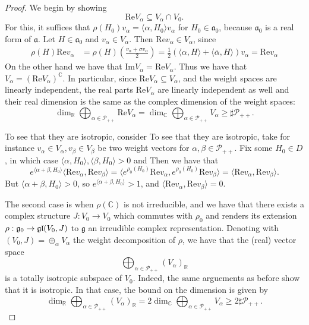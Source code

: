 \documentclass{report}
\begin{document}
\begin{itemize}
\begin{proof}
        We begin by showing
        \[
        \mathrm{Re}V_\alpha \subseteq V_\alpha \cap V_0.
        \]
        For this, it suffices that $\rho(H_0) v_\alpha = \langle \alpha, H_0 \rangle v_\alpha$ for $H_0 \in \mathfrak a_0$, because $\mathfrak a_0$ is a real form of $\mathfrak a$.
        Let $H \in \mathfrak a_0$ and $ v_\alpha \in V_\alpha$.
        Then $\mathrm{Re}v_\alpha \in V_\alpha$, since
        \begin{align*}
            \rho(H) \mathrm{Re}v_\alpha &= \rho(H)\left(\frac{v_\alpha + \sigma v_\alpha}{2}\right) = \frac{1}{2}\left(\langle \alpha, H \rangle + \langle \overline \alpha, H \rangle \right)v_\alpha = \mathrm{Re}v_\alpha
        \end{align*}
        On the other hand we have that $\mathrm{Im}V_\alpha = \mathrm{Re}V_\alpha$.
        Thus we have that $V_\alpha = \left(\mathrm{Re}V_\alpha\right)^\mathbb C$.
        In particular, since $\mathrm{Re}V_\alpha \subseteq V_\alpha$, and the weight spaces are linearly independent, the real parts $\mathrm{Re}V_\alpha$ are linearly independent as well and their real dimension is the same as the complex dimension of the weight spaces:
        \[
        \dim_\mathbb R \bigoplus_{\alpha \in \mathcal P_{++}} \mathrm{Re}V_\alpha = \dim_\mathbb C \bigoplus_{\alpha \in \mathcal P_{++}} V_\alpha \geq \sharp \mathcal P_{++}.
        \]

        To see that they are isotropic, consider 
        To see that they are isotropic, take for instance $v_\alpha \in V_\alpha, v_\beta \in V_\beta$ be two weight vectors for $\alpha, \beta \in \mathcal P_{++}$.
        Fix some $H_0 \in D$, in which case $\langle \alpha, H_0 \rangle, \langle \beta, H_0 \rangle > 0$ and 
        Then we have that 
        \[
        e^{\langle \alpha + \beta, H_0 \rangle} \langle \mathrm{Re}v_\alpha, \mathrm{Re}v_\beta \rangle = \langle e^{\rho_0(H_0)} \mathrm{Re}v_\alpha, e^{\rho_0(H_0)} \mathrm{Re}v_\beta \rangle = \langle \mathrm{Re}v_\alpha, \mathrm{Re}v_\beta \rangle.
        \]
        But $\langle \alpha + \beta, H_0 \rangle > 0$, so $e^{\langle \alpha + \beta, H_0 \rangle} > 1$, and $\langle \mathrm{Re}v_\alpha, \mathrm{Re}v_\beta \rangle = 0$.

        The second case is when $\rho(\mathbb C)$ is not irreducible, and we have that there exists a complex structure $J: V_0 \to V_0$ which commutes with $\rho_0$ and renders its extension $\rho: \mathfrak g_0 \to \operatorname{{\mathfrak{gl}}}(V_0, J)$ to $\mathfrak g$ an irreudible complex representation.
        Denoting with $(V_0, J) = \oplus_\alpha V_\alpha$ the weight decomposition of $\rho$, we have that the (real) vector space
        \[
        \bigoplus_{\alpha \in \mathcal P_{++}} (V_\alpha)_\mathbb R
        \]
        is a totally isotropic subspace of $V_0$.
        Indeed, the same arguements as before show that it is isotropic.
        In that case, the bound on the dimension is given by
        \[
        \dim_\mathbb R \bigoplus_{\alpha \in \mathcal P_{++}} (V_\alpha)_\mathbb R = 2 \dim_\mathbb C \bigoplus_{\alpha \in \mathcal P_{++}} V_\alpha \geq 2 \sharp \mathcal P_{++}.
        \]
    \end{proof}
\end{itemize}
\end{document}
